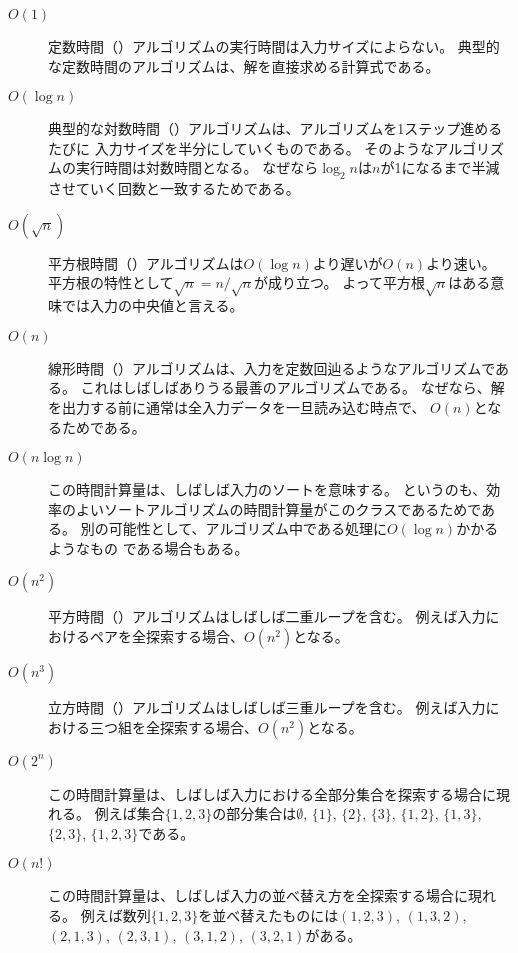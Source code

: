\begin{description}
\item[$O(1)$]
定数時間（）アルゴリズムの実行時間は入力サイズによらない。
典型的な定数時間のアルゴリズムは、解を直接求める計算式である。

\item[$O(\log n)$]
典型的な対数時間（）アルゴリズムは、アルゴリズムを1ステップ進めるたびに
入力サイズを半分にしていくものである。
そのようなアルゴリズムの実行時間は対数時間となる。
なぜなら$\log_2 n$は$n$が1になるまで半減させていく回数と一致するためである。

\item[$O(\sqrt n)$]

平方根時間（）アルゴリズムは$O(\log n)$より遅いが$O(n)$より速い。
平方根の特性として$\sqrt n = n/\sqrt n$が成り立つ。
よって平方根$\sqrt n$はある意味では入力の中央値と言える。

\item[$O(n)$]

線形時間（）アルゴリズムは、入力を定数回辿るようなアルゴリズムである。
これはしばしばありうる最善のアルゴリズムである。
なぜなら、解を出力する前に通常は全入力データを一旦読み込む時点で、
$O(n)$となるためである。

\item[$O(n \log n)$]
この時間計算量は、しばしば入力のソートを意味する。
というのも、効率のよいソートアルゴリズムの時間計算量がこのクラスであるためである。
別の可能性として、アルゴリズム中である処理に$O(\log n)$かかるようなもの
である場合もある。

\item[$O(n^2)$]
平方時間（）アルゴリズムはしばしば二重ループを含む。
例えば入力におけるペアを全探索する場合、$O(n^2)$となる。

\item[$O(n^3)$]
立方時間（）アルゴリズムはしばしば三重ループを含む。
例えば入力における三つ組を全探索する場合、$O(n^2)$となる。

\item[$O(2^n)$]
この時間計算量は、しばしば入力における全部分集合を探索する場合に現れる。
例えば集合$\{1,2,3\}$の部分集合は$\emptyset$, $\{1\}$, $\{2\}$, $\{3\}$, $\{1,2\}$,
$\{1,3\}$, $\{2,3\}$, $\{1,2,3\}$である。

\item[$O(n!)$]
この時間計算量は、しばしば入力の並べ替え方を全探索する場合に現れる。
例えば数列$\{1,2,3\}$を並べ替えたものには$(1,2,3)$, $(1,3,2)$, $(2,1,3)$, $(2,3,1)$,
$(3,1,2)$, $(3,2,1)$がある。
\end{description}

